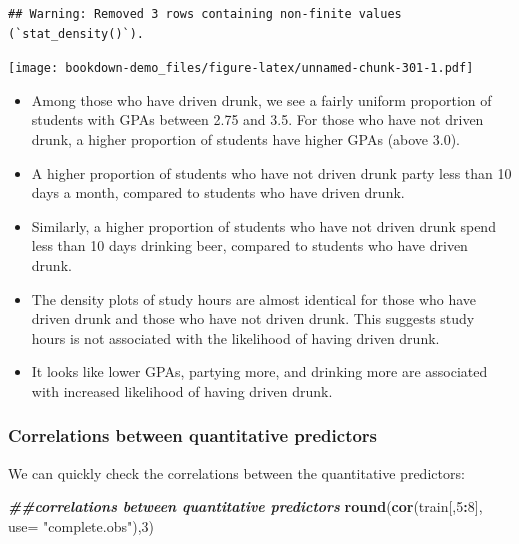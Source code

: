 \documentclass[
]{book}
\newenvironment{Shaded}{\begin{snugshade}}{\end{snugshade}}
\newcommand{\AttributeTok}[1]{\textcolor[rgb]{0.13,0.29,0.53}{#1}}
\newcommand{\DecValTok}[1]{\textcolor[rgb]{0.00,0.00,0.81}{#1}}
\newcommand{\DocumentationTok}[1]{\textcolor[rgb]{0.56,0.35,0.01}{\textbf{\textit{#1}}}}
\newcommand{\FunctionTok}[1]{\textcolor[rgb]{0.13,0.29,0.53}{\textbf{#1}}}
\newcommand{\NormalTok}[1]{#1}
\newcommand{\SpecialCharTok}[1]{\textcolor[rgb]{0.81,0.36,0.00}{\textbf{#1}}}
\newcommand{\StringTok}[1]{\textcolor[rgb]{0.31,0.60,0.02}{#1}}
\providecommand{\tightlist}{%
  \setlength{\itemsep}{0pt}\setlength{\parskip}{0pt}}
\begin{document}
\begin{verbatim}
## Warning: Removed 3 rows containing non-finite values (`stat_density()`).
\end{verbatim}

\texttt{[image: bookdown-demo\_files/figure-latex/unnamed-chunk-301-1.pdf]}

\begin{itemize}
\tightlist
\item
  Among those who have driven drunk, we see a fairly uniform proportion of students with GPAs between 2.75 and 3.5. For those who have not driven drunk, a higher proportion of students have higher GPAs (above 3.0).
\item
  A higher proportion of students who have not driven drunk party less than 10 days a month, compared to students who have driven drunk.
\item
  Similarly, a higher proportion of students who have not driven drunk spend less than 10 days drinking beer, compared to students who have driven drunk.
\item
  The density plots of study hours are almost identical for those who have driven drunk and those who have not driven drunk. This suggests study hours is not associated with the likelihood of having driven drunk.
\item
  It looks like lower GPAs, partying more, and drinking more are associated with increased likelihood of having driven drunk.
\end{itemize}

\hypertarget{correlations-between-quantitative-predictors}{%
\subsubsection*{Correlations between quantitative predictors}\label{correlations-between-quantitative-predictors}}

We can quickly check the correlations between the quantitative predictors:

\begin{Shaded}
\begin{Highlighting}[]
\DocumentationTok{\#\#correlations between quantitative predictors}
\FunctionTok{round}\NormalTok{(}\FunctionTok{cor}\NormalTok{(train[,}\DecValTok{5}\SpecialCharTok{:}\DecValTok{8}\NormalTok{], }\AttributeTok{use=} \StringTok{"complete.obs"}\NormalTok{),}\DecValTok{3}\NormalTok{)}
\end{Highlighting}
\end{Shaded}
\end{document}

